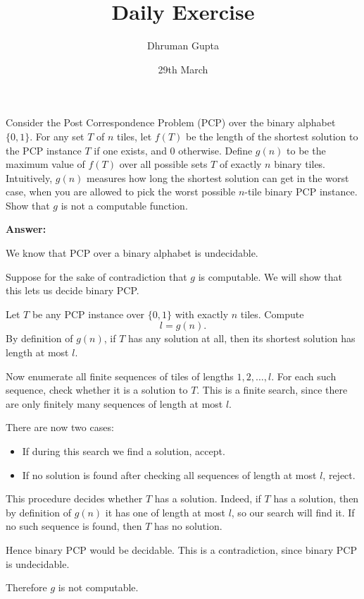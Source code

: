 \documentclass[11pt]{article}
\title{Daily Exercise}
\author{Dhruman Gupta}
\date{29th March}
\begin{document}

Consider the Post Correspondence Problem (PCP) over the binary alphabet $\{0, 1\}$. For any set $T$ of $n$ tiles, let $f(T)$ be the length of the shortest solution to the PCP instance $T$ if one exists, and $0$ otherwise. Define $g(n)$ to be the maximum value of $f(T)$ over all possible sets $T$ of exactly $n$ binary tiles. Intuitively, $g(n)$ measures how long the shortest solution can get in the worst case, when you are allowed to pick the worst possible $n$-tile binary PCP instance. Show that $g$ is not a computable function.

\textbf{Answer:}

We know that PCP over a binary alphabet is undecidable.

Suppose for the sake of contradiction that $g$ is computable. We will show that this lets us decide binary PCP.

Let $T$ be any PCP instance over $\{0,1\}$ with exactly $n$ tiles. Compute
\[
l = g(n).
\]
By definition of $g(n)$, if $T$ has any solution at all, then its shortest solution has length at most $l$.

Now enumerate all finite sequences of tiles of lengths $1,2,\dots,l$. For each such sequence, check whether it is a solution to $T$. This is a finite search, since there are only finitely many sequences of length at most $l$.

There are now two cases:
\begin{itemize}
    \item If during this search we find a solution, accept.
    \item If no solution is found after checking all sequences of length at most $l$, reject.
\end{itemize}

This procedure decides whether $T$ has a solution. Indeed, if $T$ has a solution, then by definition of $g(n)$ it has one of length at most $l$, so our search will find it. If no such sequence is found, then $T$ has no solution.

Hence binary PCP would be decidable. This is a contradiction, since binary PCP is undecidable.

Therefore $g$ is not computable.
\end{document}
